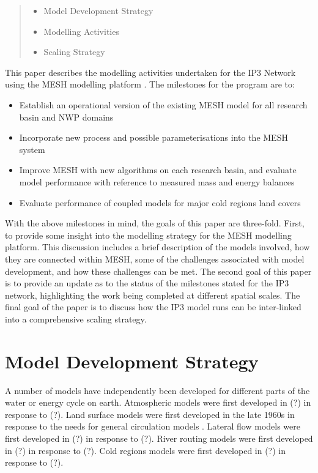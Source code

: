 \documentclass[hess]{copernicus}
\begin{document}
\begin{abstract}
\begin{itemize}
	\item Model Development Strategy
	\item Modelling Activities
	\item Scaling Strategy
\end{itemize}
\end{abstract}



\introduction
This paper describes the modelling activities undertaken for the IP3 Network using the MESH modelling platform \citep{pietroniro_etal:2007}. The milestones for the program are to:

\begin{itemize}
	\item Establish an operational version of the existing MESH model for all research basin and NWP domains
	\item Incorporate new process and possible parameterisations into the MESH system
	\item Improve MESH with new algorithms on each research basin, and evaluate model performance with reference to measured mass and energy balances
	\item Evaluate performance of coupled models for major cold regions land covers
\end{itemize}

With the above milestones in mind, the goals of this paper are three-fold. First, to provide some insight into the modelling strategy for the MESH modelling platform. This discussion includes a brief description of the models involved, how they are connected within MESH, some of the challenges associated with model development, and how these challenges can be met. The second goal of this paper is to provide an update as to the status of the milestones stated for the IP3 network, highlighting the work being completed at different spatial scales. The final goal of the paper is to discuss how the IP3 model runs can be inter-linked into a comprehensive scaling strategy.

\section{Model Development Strategy}
A number of models have independently been developed for different parts of the water or energy cycle on earth. Atmospheric models were first developed in (?) in response to (?). Land surface models were first developed in the late 1960s in response to the needs for general circulation models \citep{manabe:1969}. Lateral flow models were first developed in (?) in response to (?). River routing models were first developed in (?) in response to (?). Cold regions models were first developed in (?) in response to (?).
\end{document}
